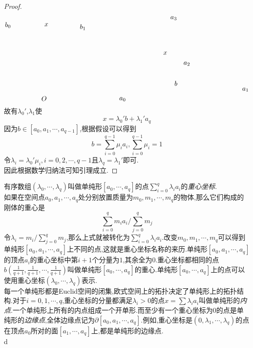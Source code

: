 \documentclass{article}
\begin{document}
\begin{proof}
\[\begin{tikzpicture}[x=0.75pt,y=0.75pt,yscale=-1,xscale=1]
    \draw (91,45.4) node [anchor=north west][inner sep=0.75pt]    {$b_{0}$};
    \draw (169,47.4) node [anchor=north west][inner sep=0.75pt]    {$x$};
    \draw (239,49.4) node [anchor=north west][inner sep=0.75pt]    {$b_{1}$};
    \draw (163,191.4) node [anchor=north west][inner sep=0.75pt]    {$O$};
    \draw (404,103.4) node [anchor=north west][inner sep=0.75pt]    {$x$};
    \draw (426,161.4) node [anchor=north west][inner sep=0.75pt]    {$b$};
    \draw (418,33.4) node [anchor=north west][inner sep=0.75pt]    {$a_{3}$};
    \draw (560,174.4) node [anchor=north west][inner sep=0.75pt]    {$a_{1}$};
    \draw (444,123.4) node [anchor=north west][inner sep=0.75pt]    {$a_{2}$};
    \draw (317,193.4) node [anchor=north west][inner sep=0.75pt]    {$a_{0}$};
    \end{tikzpicture}\]
    故有$\lambda_0'$,$\lambda_1$使
    $$
    x = \lambda_0'b + \lambda_1' a_q
    $$
    因为$b \in [a_0,a_1,\cdots,a_{q-1}]$,根据假设可以得到
    $$
    b = \sum_{i = 0}^{q-1}\mu_i a_i, \sum_{i = 0}^{q-1}\mu_i = 1
    $$
    令$\lambda_i = \lambda_0' \mu_i, i = 0,2,\cdots,q-1$且$\lambda_q = \lambda_1'$即可.\\
    因此根据数学归纳法可知引理成立.
\end{proof}
有序数组$(\lambda_0,\cdots,\lambda_q)$叫做单纯形$[a_0,\cdots,a_q]$的点$\sum_{i = 0}^q \lambda_i a_i$的\emph{重心坐标}.\\
如果在空间点$a_0,a_1,\cdots,a_q$处分别放置质量为$m_0,m_1,\cdots,m_q$的物体,那么它们构成的刚体的重心是
$$
\sum_{i = 0}^q m_i a_i/\sum_{j = 0}^q m_j
$$
令$\lambda_i = m_i /\sum_{j = 0}^q m_j$,那么上式就被转化为$\sum_{i = 0}^q \lambda_i a_i$.改变$m_0,m_1,\cdots,m_q$可以得到单纯形$[a_0,a_1,\cdots,a_q]$上不同的点,这就是重心坐标名称的来历.单纯形$[a_0,a_1,\cdots,a_q]$的顶点$a_i$的重心坐标中第$i+1$个分量为$1$,其余全为$0$.重心坐标都相同的点$b(\frac{1}{q+1},\frac{1}{q+1},\cdots,\frac{1}{q+1})$叫做单纯形$[a_0,\cdots,a_q]$的重心.单纯形$[a_0,\cdots,a_q]$上的点可以使用重心坐标$(\lambda_0,\cdots,\lambda_q)$表示.\\
每一个单纯形都是Euclid空间的闭集,欧式空间上的拓扑决定了单纯形上的拓扑结构.对于$i = 0,1,\cdots,q$,重心坐标的分量都满足$\lambda_i >0$的点$x = \sum \lambda_i a_i$叫做单纯形的\emph{内点}.一个单纯形上所有的内点组成一个开单形.而至少有一个重心坐标为$0$的点是单纯形的\emph{边缘点},全体边缘点记为$\partial[a_0,a_1,\cdots,a_q]$.例如,重心坐标是$(0,\lambda_1,\cdots,\lambda_q)$的点在顶点$a_0$所对的面$[a_1,\cdots,a_q]$上,都是单纯形的边缘点.\\d
\end{document}
